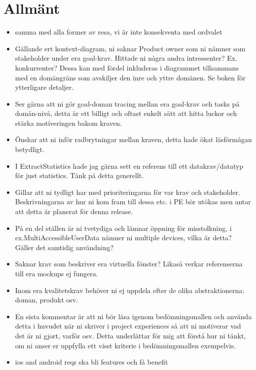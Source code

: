 \documentclass[a4paper]{article}
\begin{document}
	\thispagestyle{empty}
	\setcounter{page}{0}
	\pagebreak
	\tableofcontents
	\pagebreak

\section{Allmänt}
\begin{itemize}

	\item samma med alla former av resa, vi är inte konsekventa med ordvalet
	\item Gällande ert kontext-diagram, ni saknar Product owner som ni nämner som stakeholder under era goal-krav. Hittade ni några andra intressenter? Ex. konkurrenter? Dessa kan med fördel inkluderas i diagrammet tillsammans med en domängräns som avskiljer den inre och yttre domänen. Se boken för ytterligare detaljer.
	\item Ser gärna att ni gör goal-doman tracing mellan era goal-krav och tasks på domän-nivå, detta är ett billigt och oftast enkelt sätt att hitta luckor och stärka motiveringen bakom kraven.
	\item Önskar att ni inför radbrytningar mellan kraven, detta hade ökat läsförmågan betydligt.
	
	\item I ExtractStatistics hade jag gärna sett en referens till ett datakrav/datatyp för just statistics. Tänk på detta generellt.

	\item Gillar att ni tydligt har med prioriteringarna för var krav och stakeholder. Beskrivningarna av hur ni kom fram till dessa etc. i PE bör utökas men antar att detta är planerat för denna release.
	\item På en del ställen är ni tvetydiga och lämnar öppning för misstolkning, i ex.MultiAccessibleUserData nämner ni multiple devices, vilka är detta? Gäller det samtidig användning?
	\item Saknar krav som beskriver era virtuella fönster? Likaså verkar referenserna till era mockups ej fungera.
	\item Inom era kvalitetskrav behöver ni ej uppdela efter de olika abstraktionerna: doman, produkt osv.
	\item En sista kommentar är att ni bör läsa igenom bedömningsmallen och använda detta i huvudet när ni skriver i project experiences så att ni motiverar vad det är ni gjort, varför osv. Detta underlättar för mig att förstå hur ni tänkt, om ni anser er uppfylla ett visst kriterie i bedömningsmallen exempelvis.
	\item ios and android reqs ska bli features och få benefit
\end{itemize}
\end{document}
